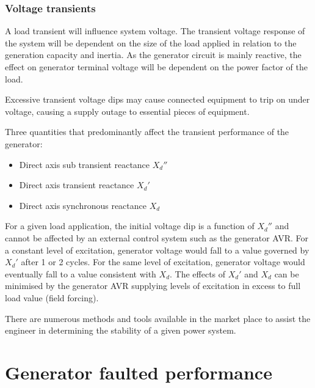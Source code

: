 \subsubsection{Voltage transients}
A load transient will influence system voltage. The transient voltage response of the system will be dependent on the size of the load applied in relation to the generation capacity and inertia. As the generator circuit is mainly reactive, the effect on generator terminal voltage will be dependent on the power factor of the load.
\begin{quoting}
    Excessive transient voltage dips may cause connected equipment to trip on under voltage, causing a supply outage to essential pieces of equipment.
\end{quoting}
Three quantities that predominantly affect the transient performance of the generator:
\begin{itemize}
    \item Direct axis sub transient reactance $X_d''$
    \item Direct axis transient reactance $X_d'$
    \item Direct axis synchronous reactance $X_d$
\end{itemize}
For a given load application, the initial voltage dip is a function of $X_d''$ and cannot be affected by an external control system such as the generator AVR. For a constant level of excitation, generator voltage would fall to a value governed by $X_d'$ after 1 or 2 cycles. For the same level of excitation, generator voltage would eventually fall to a value consistent with $X_d$. The effects of $X_d'$ and $X_d$ can be minimised by the generator AVR supplying levels of excitation in excess to full load value (field forcing).
\begin{quoting}
    There are numerous methods and tools available in the market place to assist the engineer in determining the stability of a given power system.
\end{quoting}
\section{Generator faulted performance}
